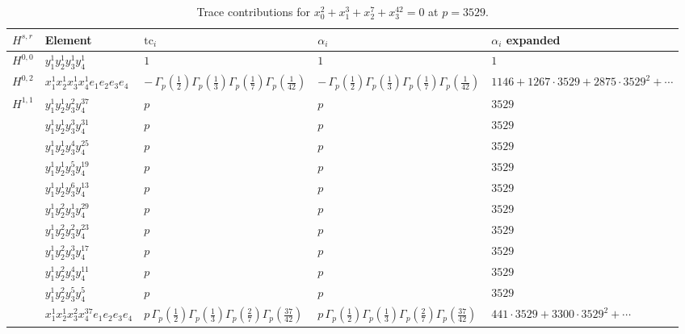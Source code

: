 \documentclass[11pt]{article}
\begin{document}
\begin{table}[ht]
\centering
\caption{Trace contributions for $x_0^{2} + x_1^{3} + x_2^{7} + x_3^{42} = 0$ at $p=3529$.}\label{tab:diagonal-1}
\renewcommand{\arraystretch}{1.1}
{\scriptsize
\begin{tabular}{@{}lllll@{}}
\toprule
$H^{s,r}$ & Element & $\mathrm{tc}_i$ & $\alpha_i$ & $\alpha_i$ expanded \\
\midrule
$H^{0,0}$ & $y_{1}^{1} y_{2}^{1} y_{3}^{1} y_{4}^{1}$ & $1$ & $1$ & $1$ \\
\midrule
$H^{0,2}$ & $x_{1}^{1} x_{2}^{1} x_{3}^{1} x_{4}^{1}  e_{1} e_{2} e_{3} e_{4}$ & $- \, \Gamma_p \left( \frac{1}{2} \right) \Gamma_p \left( \frac{1}{3} \right) \Gamma_p \left( \frac{1}{7} \right) \Gamma_p \left( \frac{1}{42} \right)$ & $- \, \Gamma_p \left( \frac{1}{2} \right) \Gamma_p \left( \frac{1}{3} \right) \Gamma_p \left( \frac{1}{7} \right) \Gamma_p \left( \frac{1}{42} \right)$ & $1146{+}1267{\cdot}3529{+}2875{\cdot}3529^{2}{+}\cdots$ \\
\midrule
$H^{1,1}$ & $y_{1}^{1} y_{2}^{1} y_{3}^{2} y_{4}^{37}$ & $p \,$ & $p \,$ & $3529$ \\
 & $y_{1}^{1} y_{2}^{1} y_{3}^{3} y_{4}^{31}$ & $p \,$ & $p \,$ & $3529$ \\
 & $y_{1}^{1} y_{2}^{1} y_{3}^{4} y_{4}^{25}$ & $p \,$ & $p \,$ & $3529$ \\
 & $y_{1}^{1} y_{2}^{1} y_{3}^{5} y_{4}^{19}$ & $p \,$ & $p \,$ & $3529$ \\
 & $y_{1}^{1} y_{2}^{1} y_{3}^{6} y_{4}^{13}$ & $p \,$ & $p \,$ & $3529$ \\
 & $y_{1}^{1} y_{2}^{2} y_{3}^{1} y_{4}^{29}$ & $p \,$ & $p \,$ & $3529$ \\
 & $y_{1}^{1} y_{2}^{2} y_{3}^{2} y_{4}^{23}$ & $p \,$ & $p \,$ & $3529$ \\
 & $y_{1}^{1} y_{2}^{2} y_{3}^{3} y_{4}^{17}$ & $p \,$ & $p \,$ & $3529$ \\
 & $y_{1}^{1} y_{2}^{2} y_{3}^{4} y_{4}^{11}$ & $p \,$ & $p \,$ & $3529$ \\
 & $y_{1}^{1} y_{2}^{2} y_{3}^{5} y_{4}^{5}$ & $p \,$ & $p \,$ & $3529$ \\
 & $x_{1}^{1} x_{2}^{1} x_{3}^{2} x_{4}^{37}  e_{1} e_{2} e_{3} e_{4}$ & $p \, \Gamma_p \left( \frac{1}{2} \right) \Gamma_p \left( \frac{1}{3} \right) \Gamma_p \left( \frac{2}{7} \right) \Gamma_p \left( \frac{37}{42} \right)$ & $p \, \Gamma_p \left( \frac{1}{2} \right) \Gamma_p \left( \frac{1}{3} \right) \Gamma_p \left( \frac{2}{7} \right) \Gamma_p \left( \frac{37}{42} \right)$ & $441{\cdot}3529{+}3300{\cdot}3529^{2}{+}\cdots$ \\

\end{tabular}}
\end{table}
\end{document}
